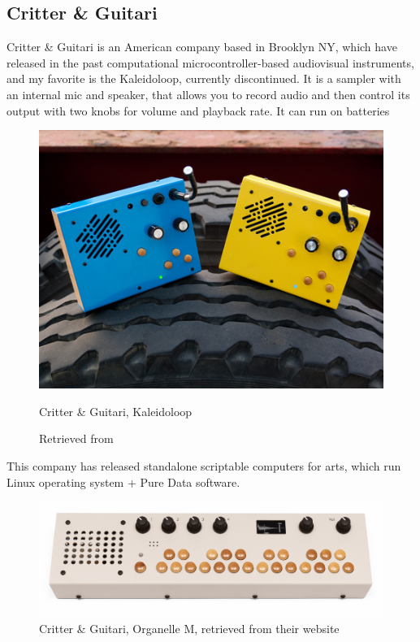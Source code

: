 \subsection{Critter \& Guitari}

Critter \& Guitari is an American company based in Brooklyn NY, which have released in the past computational microcontroller-based audiovisual instruments, and my favorite is the Kaleidoloop, currently discontinued. It is a sampler with an internal mic and speaker, that allows you to record audio and then control its output with two knobs for volume and playback rate. It can run on batteries

\begin{figure}[h]
  \centering
  \includegraphics[width=0.75\linewidth,height=0.25\textheight,keepaspectratio]{images/critter-and-guitari-kaleidoloop.jpg}
  \caption{Critter \& Guitari, Kaleidoloop}
  \caption*{Retrieved from \cite{website-critter-and-guitari-kaleidoloop}}
  \label{fig:critter-and-guitari-kaleidoloop}
\end{figure}

This company has released standalone scriptable computers for arts, which run Linux operating system + Pure Data software.

\begin{figure}[h]
  \centering
  \includegraphics[width=0.75\linewidth,height=0.25\textheight,keepaspectratio]{images/critter-and-guitari-organelle-m.jpg}
  \caption{Critter \& Guitari, Organelle M, retrieved from their website}
  \label{fig:critter-and-guitari-organelle-m}
\end{figure}

